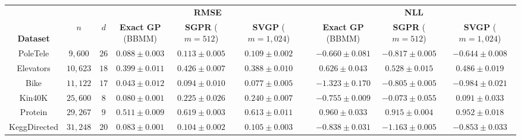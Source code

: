 \begin{tabular}{ cccccccccc }
  \toprule
  &&&
	\multicolumn{3}{c}{{\bf RMSE}}  && \multicolumn{3}{c}{{\bf NLL}}  \\
  \cmidrule{4-6} \cmidrule{8-10}
  \thead{\\{\bf Dataset}} & \thead{\\$n$} & \thead{\\$d$} &
  \thead{{\bf Exact GP} \\ (BBMM)} & \thead{{\bf SGPR} \\ ($m\!=\!512$)} & \thead{{\bf SVGP} \\ ($m\!=\!1,\!024$)}
	&& \thead{{\bf Exact GP} \\ (BBMM)} & \thead{{\bf SGPR} \\ ($m\!=\!512$)} & \thead{{\bf SVGP} \\ ($m\!=\!1,\!024$)}
  \\
  \midrule
	PoleTele             & $9,\!600$          & $26$  &   $\mathbf{0.088}\pm 0.003$           & $0.113\pm 0.005$ & $0.109\pm 0.002$          &&  $-0.660\pm 0.081$          &  $-0.817\pm 0.005$             &  $\mathbf{-0.644}\pm 0.008$    \\
	Elevators            & $10,\!623$         & $18$  &   $0.399\pm 0.011$                    & $0.426\pm 0.007$ & $\mathbf{0.388}\pm 0.010$ &&   $0.626\pm 0.043$          &   $0.528\pm 0.015$             &   $\mathbf{0.486}\pm 0.019$    \\
	Bike                 & $11,\!122$         & $17$  &   $\mathbf{0.043}\pm 0.012$           & $0.094\pm 0.010$ & $0.077\pm 0.005$          &&  $\mathbf{-1.323}\pm 0.170$ &  $-0.805\pm 0.005$             &  $-0.984\pm 0.021$             \\
	Kin40K               & $25,\!600$         & $8$   &   $\mathbf{0.080}\pm 0.001$           & $0.225\pm 0.026$ & $0.240\pm 0.007$          &&  $\mathbf{-0.755}\pm 0.009$ &  $-0.073\pm 0.055$             &   $0.091\pm 0.033$             \\
	Protein              & $29,\!267$         & $9$   &   $\mathbf{0.511}\pm 0.009$           & $0.619\pm 0.003$ & $0.613\pm 0.011$          &&   $0.960\pm 0.033$          &   $\mathbf{0.915}\pm 0.004$    &   $0.952\pm 0.018$             \\
	KeggDirected         & $31,\!248$         & $20$  &   $\mathbf{0.083}\pm 0.001$           & $0.104\pm 0.002$ & $0.105\pm 0.003$          &&  $-0.838\pm 0.031$          &  $\mathbf{-1.163}\pm 0.005$    &  $-0.853\pm 0.033$             \\

\end{tabular}
